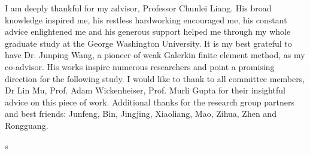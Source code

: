 \begin{acknowledgements}

I am deeply thankful for my advisor, Professor Chunlei Liang. His broad knowledge inspired me, his restless hardworking  encouraged me, his constant advice enlightened me and his generous support helped me through my whole graduate study at the George Washington University. It is my best grateful to have Dr. Junping Wang, a pioneer of weak Galerkin finite element method, as my co-advisor. His works inspire numerous researchers and point a promising direction for the following study. I would like to thank to all committee members, Dr Lin Mu, Prof. Adam Wickenheiser, Prof. Murli Gupta for their insightful advice on this piece of work. Additional thanks for the research group partners and best friends: Junfeng, Bin, Jingjing, Xiaoliang, Mao, Zihua, Zhen and Rongguang.

\end{acknowledgements}s

